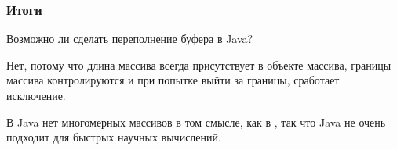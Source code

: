 \subsubsection{Итоги}


Возможно ли сделать переполнение буфера в Java?

Нет, потому что длина массива всегда присутствует в объекте массива,
границы массива контролируются и при попытке выйти за границы, сработает исключение.


В Java нет многомерных массивов в том смысле, как в \CCpp, так что Java не очень подходит
для быстрых научных вычислений.
%
